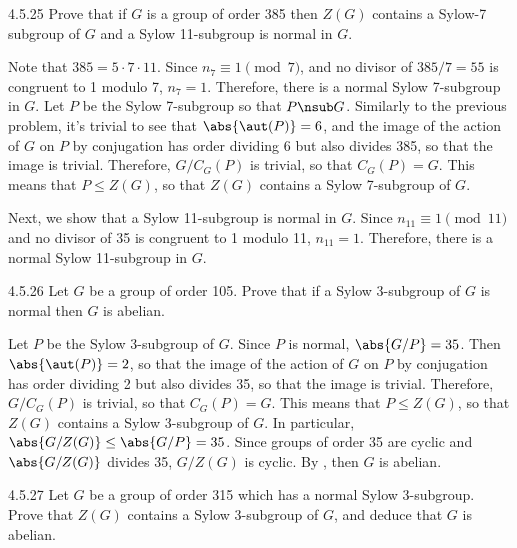 \begin{exercise}{4.5.25}
	Prove that if $G$ is a group of order 385 then $Z(G)$ contains a Sylow-7 subgroup of $G$ and a Sylow 11-subgroup is normal in $G$.
\end{exercise}

\begin{sol}
	Note that $385 = 5 \cdot 7 \cdot 11$.
	Since $n_7 \equiv 1 \pmod 7$, and no divisor of $385/7 = 55$ is congruent to 1 modulo 7, $n_7 = 1$.
	Therefore, there is a normal Sylow 7-subgroup in $G$.
	Let $P$ be the Sylow 7-subgroup so that $P \nsub G$.
	Similarly to the previous problem, it's trivial to see that $\abs{\aut(P)} = 6$, and the image of the action of $G$ on $P$ by conjugation has order dividing 6 but also divides 385, so that the image is trivial.
	Therefore, $G/C_G(P)$ is trivial, so that $C_G(P) = G$.
	This means that $P \leq Z(G)$, so that $Z(G)$ contains a Sylow 7-subgroup of $G$.

	Next, we show that a Sylow 11-subgroup is normal in $G$.
	Since $n_{11} \equiv 1 \pmod 11$ and no divisor of 35 is congruent to 1 modulo 11, $n_{11} = 1$.
	Therefore, there is a normal Sylow 11-subgroup in $G$.
\end{sol}

\begin{exercise}{4.5.26}
	Let $G$ be a group of order 105.
	Prove that if a Sylow 3-subgroup of $G$ is normal then $G$ is abelian.
\end{exercise}

\begin{sol}
	Let $P$ be the Sylow 3-subgroup of $G$.
	Since $P$ is normal, $\abs{G/P} = 35$.
	Then $\abs{\aut(P)} = 2$, so that the image of the action of $G$ on $P$ by conjugation has order dividing 2 but also divides 35, so that the image is trivial.
	Therefore, $G/C_G(P)$ is trivial, so that $C_G(P) = G$.
	This means that $P \leq Z(G)$, so that $Z(G)$ contains a Sylow 3-subgroup of $G$.
	In particular, $\abs{G/Z(G)} \leq \abs{G/P} = 35$.
	Since groups of order 35 are cyclic and $\abs{G/Z(G)}$ divides 35, $G/Z(G)$ is cyclic.
	By , then $G$ is abelian.
\end{sol}

\begin{exercise}{4.5.27}
	Let $G$ be a group of order 315 which has a normal Sylow 3-subgroup.
	Prove that $Z(G)$ contains a Sylow 3-subgroup of $G$, and deduce that $G$ is abelian.
\end{exercise}

